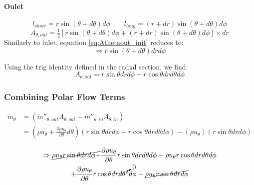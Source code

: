 \documentclass[12pt, letterpaper, twoside]{article}
\begin{document}
        \paragraph{Oulet}
            \begin{equation*}
                l_{short} = r\sin\left(\theta + d\theta\right) d\phi \qquad
                l_{long} = (r + dr)\sin\left(\theta + d\theta\right) d\phi 
            \end{equation*}
            \begin{equation}\label{eq:Athetaout_init}
                A_{\theta,out} = \tfrac{1}{2} \left[r\sin\left(\theta + d\theta\right) d\phi +  (r + dr)\sin\left(\theta + d\theta\right) d\phi \right] \times dr
            \end{equation}
            Similarly to inlet, equation \ref{eq:Athetaout_init} reduces to:
            \begin{equation*}
                \Rightarrow
                r\sin\left(\theta + d\theta \right) dr d\phi
            \end{equation*}
            
            Using the trig identity defined in the radial section, we find:
            \begin{equation}\label{eq:Athetaout_final}
                A_{\theta,out} = r\sin\theta dr d\phi + r\cos\theta dr d\theta d\phi
            \end{equation}

        \subsubsection{Combining Polar Flow Terms}
            \begin{equation*}
            \begin{split}
                \dot{m}_{\theta} & = (\dot{m}''_{\theta,out} A_{\theta,out} - \dot{m}''_{\theta,in} A_{\theta,in}) \\
                & = \left( \rho u_{\theta}  + \frac{\partial \rho u_{\theta}}{\partial \theta} d\theta \right) 
               \left(r\sin\theta dr d\phi + r\cos\theta dr d\theta d\phi\right) - 
               \left(\rho u_{\theta}\right) \left(r\sin\theta dr d\phi\right)
            \end{split}
            \end{equation*}

            \begin{multline*}
                \Rightarrow
                \cancel{\rho u_{\theta}r\sin\theta dr d\phi +} 
                \frac{\partial\rho u_{\theta}}{\partial\theta} r\sin\theta dr d\theta d\phi +
                \rho u_{\theta} r\cos\theta dr d\theta d\phi \\ + 
                \frac{\partial\rho u_{\theta}}{\partial\theta} r\cos\theta dr \cancelto{0}{d\theta^2} d\phi -
                \cancel{\rho u_{\theta}r\sin\theta dr d\phi}
            \end{multline*}
\end{document}
